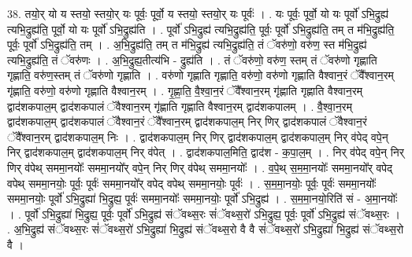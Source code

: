 \documentclass[17pt]{extarticle}
\begin{document}
38. तयो॒र् यो य स्तयो॒ स्तयो॒र् यः पूर्वः॒ पूर्वो॒ य स्तयो॒ स्तयो॒र् यः पूर्वः॑ । . यः पूर्वः॒ पूर्वो॒ यो यः पूर्वो॑ ऽभि॒द्रुह्य॑ त्यभि॒द्रुह्य॑ति॒ पूर्वो॒ यो यः पूर्वो॑ ऽभि॒द्रुह्य॑ति । . पूर्वो॑ ऽभि॒द्रुह्य॑ त्यभि॒द्रुह्य॑ति॒ पूर्वः॒ पूर्वो॑ ऽभि॒द्रुह्य॑ति॒ तम् त म॑भि॒द्रुह्य॑ति॒ पूर्वः॒ पूर्वो॑ ऽभि॒द्रुह्य॑ति॒ तम् । . अ॒भि॒द्रुह्य॑ति॒ तम् त म॑भि॒द्रुह्य॑ त्यभि॒द्रुह्य॑ति॒ तं ॅवरु॑णो॒ वरु॑ण॒ स्त म॑भि॒द्रुह्य॑ त्यभि॒द्रुह्य॑ति॒ तं ॅवरु॑णः । . अ॒भि॒द्रुह्य॒तीत्य॑भि - द्रुह्य॑ति । . तं ॅवरु॑णो॒ वरु॑ण॒ स्तम् तं ॅवरु॑णो गृह्णाति गृह्णाति॒ वरु॑ण॒स्तम् तं ॅवरु॑णो गृह्णाति । . वरु॑णो गृह्णाति गृह्णाति॒ वरु॑णो॒ वरु॑णो गृह्णाति वैश्वान॒रं ॅवै᳚श्वान॒रम् गृ॑ह्णाति॒ वरु॑णो॒ वरु॑णो गृह्णाति वैश्वान॒रम् । . गृ॒ह्णा॒ति॒ वै॒श्वा॒न॒रं ॅवै᳚श्वान॒रम् गृ॑ह्णाति गृह्णाति वैश्वान॒रम् द्वाद॑शकपाल॒म् द्वाद॑शकपालं ॅवैश्वान॒रम् गृ॑ह्णाति गृह्णाति वैश्वान॒रम् द्वाद॑शकपालम् । . वै॒श्वा॒न॒रम् द्वाद॑शकपाल॒म् द्वाद॑शकपालं ॅवैश्वान॒रं ॅवै᳚श्वान॒रम् द्वाद॑शकपाल॒म् निर् णिर् द्वाद॑शकपालं ॅवैश्वान॒रं ॅवै᳚श्वान॒रम् द्वाद॑शकपाल॒म् निः । . द्वाद॑शकपाल॒म् निर् णिर् द्वाद॑शकपाल॒म् द्वाद॑शकपाल॒म् निर् व॑पेद् वपे॒न् निर् द्वाद॑शकपाल॒म् द्वाद॑शकपाल॒म् निर् व॑पेत् । . द्वाद॑शकपाल॒मिति॒ द्वाद॑श - क॒पा॒ल॒म् । . निर् व॑पेद् वपे॒न् निर् णिर् व॑पेथ् सममा॒नयोः᳚ सममा॒नयो᳚र् वपे॒न् निर् णिर् व॑पेथ् सममा॒नयोः᳚ । . व॒पे॒थ् स॒म॒मा॒नयोः᳚ सममा॒नयो᳚र् वपेद् वपेथ् सममा॒नयोः॒ पूर्वः॒ पूर्वः॑ सममा॒नयो᳚र् वपेद् वपेथ् सममा॒नयोः॒ पूर्वः॑ । . स॒म॒मा॒नयोः॒ पूर्वः॒ पूर्वः॑ सममा॒नयोः᳚ सममा॒नयोः॒ पूर्वो॑ ऽभि॒द्रुह्या॑ भि॒द्रुह्य॒ पूर्वः॑ सममा॒नयोः᳚ सममा॒नयोः॒ पूर्वो॑ ऽभि॒द्रुह्य॑ । . स॒म॒मा॒नयो॒रिति॑ सं - अ॒मा॒नयोः᳚ । . पूर्वो॑ ऽभि॒द्रुह्या॑ भि॒द्रुह्य॒ पूर्वः॒ पूर्वो॑ ऽभि॒द्रुह्य॑ संॅवथ्स॒रः सं॑ॅवथ्स॒रो॑ ऽभि॒द्रुह्य॒ पूर्वः॒ पूर्वो॑ ऽभि॒द्रुह्य॑ संॅवथ्स॒रः । . अ॒भि॒द्रुह्य॑ संॅवथ्स॒रः सं॑ॅवथ्स॒रो॑ ऽभि॒द्रुह्या॑ भि॒द्रुह्य॑ संॅवथ्स॒रो वै वै सं॑ॅवथ्स॒रो॑ ऽभि॒द्रुह्या॑ भि॒द्रुह्य॑ संॅवथ्स॒रो वै । \newline
\end{document}
